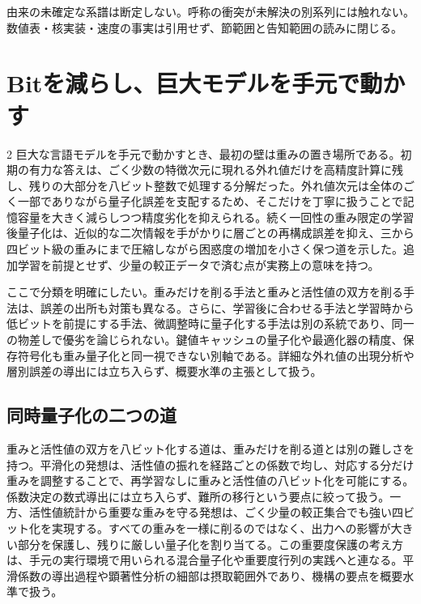 \documentclass[lualatex,a4paper,10pt]{jlreq}
\begin{document}
\begin{claimboundary}[本節の読解上の境界]
由来の未確定な系譜は断定しない。呼称の衝突が未解決の別系列には触れない。数値表・核実装・速度の事実は引用せず、節範囲と告知範囲の読みに閉じる。
\end{claimboundary}

\section{Bitを減らし、巨大モデルを手元で動かす}
\label{sec:precision}

\begin{multicols}{2}
\raggedcolumns
巨大な言語モデルを手元で動かすとき、最初の壁は重みの置き場所である。初期の有力な答えは、ごく少数の特徴次元に現れる外れ値だけを高精度計算に残し、残りの大部分を八ビット整数で処理する分解だった\autocite{llmint8}。外れ値次元は全体のごく一部でありながら量子化誤差を支配するため、そこだけを丁寧に扱うことで記憶容量を大きく減らしつつ精度劣化を抑えられる。続く一回性の重み限定の学習後量子化は、近似的な二次情報を手がかりに層ごとの再構成誤差を抑え、三から四ビット級の重みにまで圧縮しながら困惑度の増加を小さく保つ道を示した\autocite{gptq}。追加学習を前提とせず、少量の較正データで済む点が実務上の意味を持つ。

ここで分類を明確にしたい。重みだけを削る手法と重みと活性値の双方を削る手法は、誤差の出所も対策も異なる。さらに、学習後に合わせる手法と学習時から低ビットを前提にする手法、微調整時に量子化する手法は別の系統であり、同一の物差しで優劣を論じられない。鍵値キャッシュの量子化や最適化器の精度、保存符号化も重み量子化と同一視できない別軸である。詳細な外れ値の出現分析や層別誤差の導出には立ち入らず、概要水準の主張として扱う。

\subsection{同時量子化の二つの道}
重みと活性値の双方を八ビット化する道は、重みだけを削る道とは別の難しさを持つ。平滑化の発想は、活性値の振れを経路ごとの係数で均し、対応する分だけ重みを調整することで、再学習なしに重みと活性値の八ビット化を可能にする\autocite{smoothquant}。係数決定の数式導出には立ち入らず、難所の移行という要点に絞って扱う。一方、活性値統計から重要な重みを守る発想は、ごく少量の較正集合でも強い四ビット化を実現する\autocite{awq}。すべての重みを一様に削るのではなく、出力への影響が大きい部分を保護し、残りに厳しい量子化を割り当てる。この重要度保護の考え方は、手元の実行環境で用いられる混合量子化や重要度行列の実践へと連なる。平滑係数の導出過程や顕著性分析の細部は摂取範囲外であり、機構の要点を概要水準で扱う。


\end{multicols}
\end{document}
